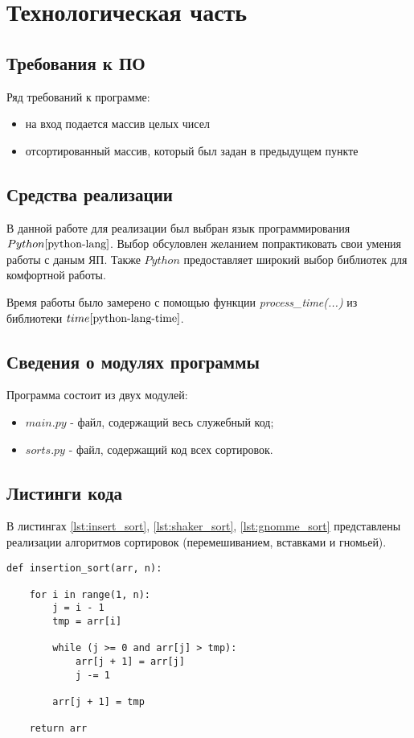 \chapter{Технологическая часть}

\section{Требования к ПО}
Ряд требований к программе:
\begin{itemize}
	\item на вход подается массив целых чисел 
    \item отсортированный массив, который был задан в предыдущем пункте \newline
\end{itemize}


\section{Средства реализации}
В данной работе для реализации был выбран язык программирования $Python \cite{python-lang}$. Выбор обсуловлен желанием попрактиковать свои умения работы с даным ЯП. Также $Python$ предоставляет широкий выбор библиотек для комфортной работы.

Время работы было замерено с помощью функции \textit{process\_time(...)} из библиотеки $time \cite{python-lang-time}$.

\section{Сведения о модулях программы}
Программа состоит из двух модулей:
\begin{itemize}
	\item $main.py$ - файл, содержащий весь служебный код;
    \item $sorts.py$ - файл, содержащий код всех сортировок. \newline
\end{itemize}


\section{Листинги кода}

В листингах \ref{lst:insert_sort}, \ref{lst:shaker_sort}, \ref{lst:gnomme_sort} представлены реализации алгоритмов сортировок (перемешиванием, вставками и гномьей).

\begin{center}
\captionsetup{justification=raggedright,singlelinecheck=off}
\begin{lstlisting}[label=lst:insert_sort,caption=Алгоритм сортировки вставками]
    def insertion_sort(arr, n):

    for i in range(1, n):
        j = i - 1
        tmp = arr[i]

        while (j >= 0 and arr[j] > tmp):
            arr[j + 1] = arr[j]
            j -= 1

        arr[j + 1] = tmp

    return arr
\end{lstlisting}
\end{center}


